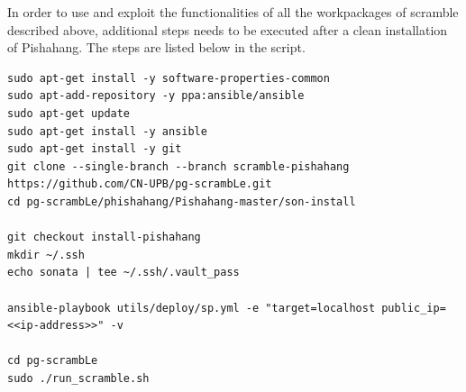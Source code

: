 In order to use and exploit the functionalities of all the workpackages of scramble described above, additional steps needs to be executed after a clean installation of Pishahang. The steps are listed below in the script.
\begin{lstlisting}[caption= install Pishahang with scramble, label=lis:Pishahang_scramble]
sudo apt-get install -y software-properties-common
sudo apt-add-repository -y ppa:ansible/ansible
sudo apt-get update
sudo apt-get install -y ansible
sudo apt-get install -y git
git clone --single-branch --branch scramble-pishahang https://github.com/CN-UPB/pg-scrambLe.git
cd pg-scrambLe/phishahang/Pishahang-master/son-install

git checkout install-pishahang
mkdir ~/.ssh
echo sonata | tee ~/.ssh/.vault_pass

ansible-playbook utils/deploy/sp.yml -e "target=localhost public_ip=<<ip-address>>" -v

cd pg-scrambLe
sudo ./run_scramble.sh

\end{lstlisting}